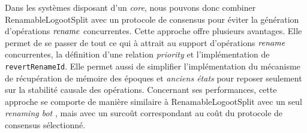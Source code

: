 Dans les systèmes disposant d'un \emph{core}, nous pouvons donc combiner RenamableLogootSplit avec un protocole de consensus pour éviter la génération d'opérations $\mathit{rename}$ concurrentes.
Cette approche offre plusieurs avantages.
Elle permet de se passer de tout ce qui à attrait au support d'opérations $\mathit{rename}$ concurrentes, \ie la définition d'une relation \emph{priority} et l'implémentation de \texttt{revertRenameId}.
Elle permet aussi de simplifier l'implémentation du mécanisme de récupération de mémoire des époques et \emph{anciens états} pour reposer seulement sur la stabilité causale des opérations.
Concernant ses performances, cette approche se comporte de manière similaire à RenamableLogootSplit avec un seul \emph{renaming bot} , mais avec un surcoût correspondant au coût du protocole de consensus sélectionné.
